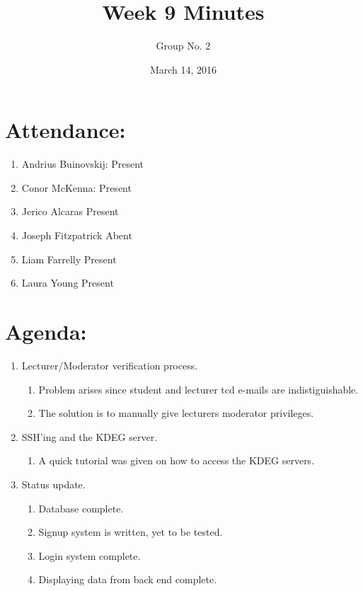 \documentclass[a4paper, 12pt]{article}
\begin{document}
\title{Week 9 Minutes}
\author{Group No. 2}
\date{March 14, 2016}
\maketitle

	\section{Attendance:}
		\begin{enumerate}[label*=\arabic*.]
			\item Andrius Buinovskij:	\dotfill Present
			\item Conor McKenna:		\dotfill Present
			\item Jerico Alcaras		\dotfill Present
			\item Joseph Fitzpatrick	\dotfill Abent
			\item Liam Farrelly		\dotfill Present
			\item Laura Young		\dotfill Present
		\end{enumerate}

	\section{Agenda:}
		\begin{enumerate}[label*=\arabic*.]
			\item Lecturer/Moderator verification process.
				\begin{enumerate}[label*=\arabic*.]
					\item Problem arises since student and lecturer tcd e-mails are indistiguishable.
					\item The solution is to manually give lecturers moderator privileges.
				\end{enumerate}
			\item SSH'ing and the KDEG server.
				\begin{enumerate}[label*=\arabic*.]
					\item A quick tutorial was given on how to access the KDEG servers.
				\end{enumerate}
			\item Status update.
				\begin{enumerate}[label*=\arabic*.]
					\item Database complete.
					\item Signup system is written, yet to be tested.
					\item Login system complete.
					\item Displaying data from back end complete.
				\end{enumerate}
		\end{enumerate}
\end{document}
